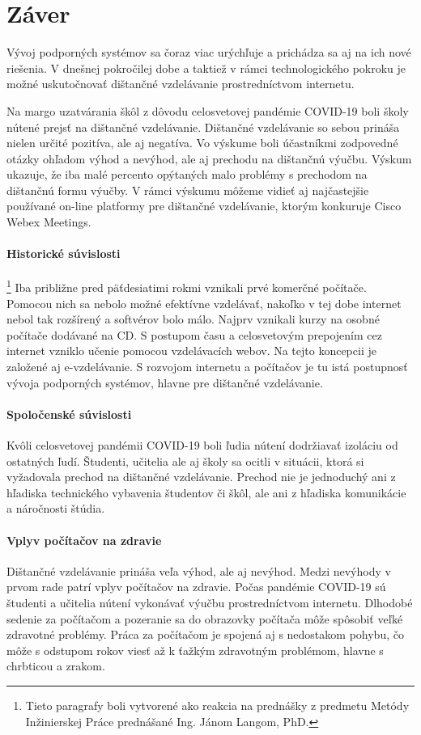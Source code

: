 \documentclass[10pt,oneside,slovak,a4paper]{article}
\begin{document}
\section*{Záver}
Vývoj podporných systémov sa čoraz viac urýchľuje a prichádza sa aj na ich nové riešenia.
V dnešnej pokročilej dobe a taktiež v rámci technologického pokroku je možné uskutočnovať dištančné vzdelávanie prostredníctvom internetu.

Na margo uzatvárania škôl z dôvodu celosvetovej pandémie COVID-19 boli školy nútené prejsť na dištančné vzdelávanie.
Dištančné vzdelávanie so sebou prináša nielen určité pozitíva, ale aj negatíva. 
Vo výskume boli účastníkmi zodpovedné otázky ohľadom výhod a nevýhod, ale aj prechodu na dištančnú výučbu.
Výskum ukazuje, že iba malé percento opýtaných malo problémy s prechodom na dištančnú formu výučby.
V rámci výskumu môžeme vidieť aj najčastejšie používané on-line platformy pre dištančné vzdelávanie, ktorým konkuruje Cisco Webex Meetings.

\paragraph{Historické súvislosti}\footnote{Tieto paragrafy boli vytvorené ako reakcia na prednášky z predmetu Metódy Inžinierskej Práce prednášané Ing. Jánom Langom, PhD.}
Iba približne pred päťdesiatimi rokmi vznikali prvé komerčné počítače.
Pomocou nich sa nebolo možné efektívne vzdelávať, nakoľko v tej dobe internet nebol tak rozšírený a softvérov bolo málo.
Najprv vznikali kurzy na osobné počítače dodávané na CD. S postupom času a celosvetovým prepojením cez internet vzniklo učenie pomocou vzdelávacích webov.
Na tejto koncepcii je založené aj e-vzdelávanie. S rozvojom internetu a počítačov je tu istá postupnosť vývoja podporných systémov, hlavne pre dištančné vzdelávanie.

\paragraph{Spoločenské súvislosti}
Kvôli celosvetovej pandémii COVID-19 boli ľudia nútení dodržiavať izoláciu od ostatných ľudí.
Študenti, učitelia ale aj školy sa ocitli v situácii, ktorá si vyžadovala prechod na dištančné vzdelávanie.
Prechod nie je jednoduchý ani z hľadiska technického vybavenia študentov či škôl, ale ani z hľadiska komunikácie a náročnosti štúdia. 

\paragraph{Vplyv počítačov na zdravie}
Dištančné vzdelávanie prináša veľa výhod, ale aj nevýhod. Medzi nevýhody v prvom rade patrí vplyv počítačov na zdravie.
Počas pandémie COVID-19 sú študenti a učitelia nútení vykonávať výučbu prostredníctvom internetu.
Dlhodobé sedenie za počítačom a pozeranie sa do obrazovky počítača môže spôsobiť veľké zdravotné problémy.
Práca za počítačom je spojená aj s nedostakom pohybu, čo môže s odstupom rokov viesť až k ťažkým zdravotným problémom, hlavne s chrbticou a zrakom.




\end{document}
